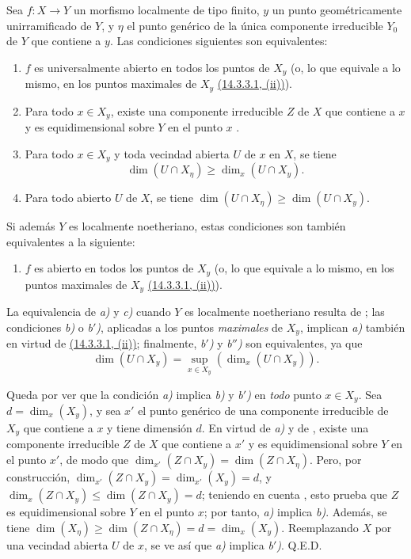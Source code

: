 \begin{corollary}[14.4.2]
\label{IV.14.4.2}
Sea $f:X\to Y$ un morfismo localmente de tipo finito, $y$ un punto geométricamente unirramificado de $Y$, y $\eta$ el punto genérico de la única componente irreducible $Y_0$ de $Y$ que contiene a $y$.
Las condiciones siguientes son equivalentes:
\begin{enumerate}[label=\emph{\alph*)}]
  \item $f$ es universalmente abierto en todos los puntos de $X_y$ \textup{(o, lo que equivale a lo mismo, en los puntos maximales de $X_y$ {\hyperlink{ega4.c04.subsec.14-3-3-1}{(14.3.3.1, (ii))}})}.
  \item Para todo $x\in X_y$, existe una componente irreducible $Z$ de $X$ que contiene a $x$ y es equidimensional sobre $Y$ en el punto $x$ .
  \item[\emph{b$'$)}] Para todo $x\in X_y$ y toda vecindad abierta $U$ de $x$ en $X$, se tiene
    \[
  \dim(U\cap X_\eta)\geq\dim_x(U\cap X_y).
  \]
  \item[\emph{b$''$)}] Para todo abierto $U$ de $X$, se tiene $\dim(U\cap X_\eta)\geq\dim(U\cap X_y)$.
\end{enumerate}

Si además $Y$ es localmente noetheriano, estas condiciones son también equivalentes a la siguiente:
\begin{enumerate}[label=\emph{\alph*)}]
  \item[\emph{c)}] $f$ es abierto en todos los puntos de $X_y$ \textup{(o, lo que equivale a lo mismo, en los puntos maximales de $X_y$ {\hyperlink{ega4.c04.subsec.14-3-3-1}{(14.3.3.1, (ii))}})}.
\end{enumerate}
\end{corollary}

La equivalencia de \emph{a)} y \emph{c)} cuando $Y$ es localmente noetheriano resulta de ; las condiciones \emph{b)} o \emph{b$'$)}, aplicadas a los puntos \emph{maximales} de $X_y$, implican \emph{a)} también en virtud de {\hyperlink{ega4.c04.subsec.14-3-3-1}{(14.3.3.1, (ii))}}; finalmente, \emph{b$'$)} y \emph{b$''$)} son equivalentes, ya que
\[
  \dim(U\cap X_y)=\sup_{x\in X_y}(\dim_x(U\cap X_y)).
\]

Queda por ver que la condición \emph{a)} implica \emph{b)} y \emph{b$'$)} en \emph{todo} punto $x\in X_y$.
Sea $d=\dim_x(X_y)$, y sea $x'$ el punto genérico de una componente irreducible de $X_y$ que contiene a $x$ y tiene dimensión $d$.
En virtud de \emph{a)} y de , existe una componente irreducible $Z$ de $X$ que contiene a $x'$ y es equidimensional sobre $Y$ en el punto $x'$, de modo que $\dim_{x'}(Z\cap X_y)=\dim(Z\cap X_\eta)$.
Pero, por construcción, $\dim_{x'}(Z\cap X_y)=\dim_{x'}(X_y)=d$, y $\dim_x(Z\cap X_y)\leq\dim(Z\cap X_y)=d$; teniendo en cuenta , esto prueba que $Z$ es equidimensional sobre $Y$ en el punto $x$; por tanto, \emph{a)} implica \emph{b)}.
Además, se tiene $\dim(X_\eta)\geq\dim(Z\cap X_\eta)=d=\dim_x(X_y)$.
Reemplazando $X$ por una vecindad abierta $U$ de $x$, se ve así que \emph{a)} implica \emph{b$'$)}.
Q.E.D.


